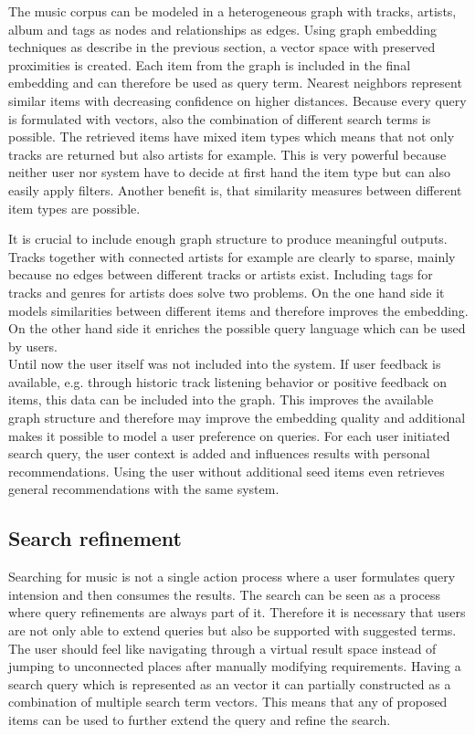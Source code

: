\documentclass[a4paper]{llncs}
\begin{document}
	The music corpus can be modeled in a heterogeneous graph with tracks, artists, album and tags as nodes and relationships as edges. Using graph embedding techniques as describe in the previous section, a vector space with preserved proximities is created. Each item from the graph is included in the final embedding and can therefore be used as query term. Nearest neighbors represent similar items with decreasing confidence on higher distances. Because every query is formulated with vectors, also the combination of different search terms is possible. The retrieved items have mixed item types which means that not only tracks are returned but also artists for example. This is very powerful because neither user nor system have to decide at first hand the item type but can also easily apply filters. Another benefit is, that similarity measures between different item types are possible.
	
	It is crucial to include enough graph structure to produce meaningful outputs. Tracks together with connected artists for example are clearly to sparse, mainly because no edges between different tracks or artists exist. Including tags for tracks and genres for artists does solve two problems. On the one hand side it models similarities between different items and therefore improves the embedding. On the other hand side it enriches the possible query language which can be used by users. \\
	
	Until now the user itself was not included into the system. If user feedback is available, e.g. through historic track listening behavior or positive feedback on items, this data can be included into the graph. This improves the available graph structure and therefore may improve the embedding quality and additional makes it possible to model a user preference on queries. For each user initiated search query, the user context is added and influences results with personal recommendations. Using the user without additional seed items even retrieves general recommendations with the same system.
	
	
	\subsection{Search refinement}
	
	Searching for music is not a single action process where a user formulates query intension and then consumes the results. The search can be seen as a process where query refinements are always part of it. Therefore it is necessary that users are not only able to extend queries but also be supported with suggested terms. The user should feel like navigating through a virtual result space instead of jumping to unconnected places after manually modifying requirements. Having a search query which is represented as an vector it can partially constructed as a combination of multiple search term vectors. This means that any of proposed items can be used to further extend the query and refine the search.
	
\end{document}
